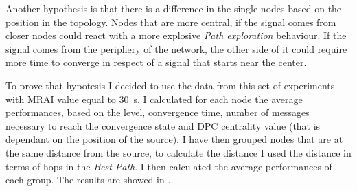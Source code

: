 Another hypothesis is that there is a difference in the single nodes based
on the position in the topology.
Nodes that are more central, if the signal comes from closer nodes could
react with a more explosive \textit{Path exploration} behaviour.
If the signal comes from the periphery of the network, the other side of
it could require more time to converge in respect of a signal that starts 
near the center.

To prove that hypotesis I decided to use the data from this set of experiments
with \ac{MRAI} value equal to \SI{30}{\second}.
I calculated for each node the average performances, based on the level, convergence
time, number of messages necessary to reach the convergence state and \ac{DPC}
centrality value (that is dependant on the position of the source).
I have then grouped nodes that are at the same distance from the source, to 
calculate the distance I used the distance in terms of hops in the \textit{Best
Path}.
I then calculated the average performances of each group.
The results are showed in .

